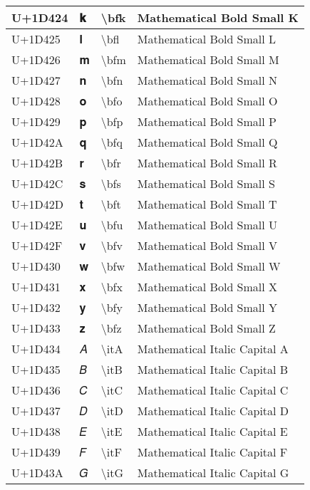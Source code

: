 \begin{table}[h]
\begin{tabulary}{\linewidth}{|L|L|L|L|}
\hline
U+1D424 & 𝐤 & {\textbackslash}bfk & Mathematical Bold Small K \\
\hline
U+1D425 & 𝐥 & {\textbackslash}bfl & Mathematical Bold Small L \\
\hline
U+1D426 & 𝐦 & {\textbackslash}bfm & Mathematical Bold Small M \\
\hline
U+1D427 & 𝐧 & {\textbackslash}bfn & Mathematical Bold Small N \\
\hline
U+1D428 & 𝐨 & {\textbackslash}bfo & Mathematical Bold Small O \\
\hline
U+1D429 & 𝐩 & {\textbackslash}bfp & Mathematical Bold Small P \\
\hline
U+1D42A & 𝐪 & {\textbackslash}bfq & Mathematical Bold Small Q \\
\hline
U+1D42B & 𝐫 & {\textbackslash}bfr & Mathematical Bold Small R \\
\hline
U+1D42C & 𝐬 & {\textbackslash}bfs & Mathematical Bold Small S \\
\hline
U+1D42D & 𝐭 & {\textbackslash}bft & Mathematical Bold Small T \\
\hline
U+1D42E & 𝐮 & {\textbackslash}bfu & Mathematical Bold Small U \\
\hline
U+1D42F & 𝐯 & {\textbackslash}bfv & Mathematical Bold Small V \\
\hline
U+1D430 & 𝐰 & {\textbackslash}bfw & Mathematical Bold Small W \\
\hline
U+1D431 & 𝐱 & {\textbackslash}bfx & Mathematical Bold Small X \\
\hline
U+1D432 & 𝐲 & {\textbackslash}bfy & Mathematical Bold Small Y \\
\hline
U+1D433 & 𝐳 & {\textbackslash}bfz & Mathematical Bold Small Z \\
\hline
U+1D434 & 𝐴 & {\textbackslash}itA & Mathematical Italic Capital A \\
\hline
U+1D435 & 𝐵 & {\textbackslash}itB & Mathematical Italic Capital B \\
\hline
U+1D436 & 𝐶 & {\textbackslash}itC & Mathematical Italic Capital C \\
\hline
U+1D437 & 𝐷 & {\textbackslash}itD & Mathematical Italic Capital D \\
\hline
U+1D438 & 𝐸 & {\textbackslash}itE & Mathematical Italic Capital E \\
\hline
U+1D439 & 𝐹 & {\textbackslash}itF & Mathematical Italic Capital F \\
\hline
U+1D43A & 𝐺 & {\textbackslash}itG & Mathematical Italic Capital G \\

\end{tabulary}
\end{table}
